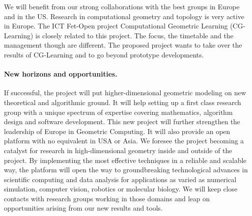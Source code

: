 We will benefit from our strong collaborations with the best groups in Europe and in the US.
Research in computational geometry and topology is very active in  Europe.  The ICT Fet-Open project Computational Geometric Learning (CG-Learning) is closely related to this project. The focus, the timetable and the management though are different. The proposed project wants to take over the results of CG-Learning and to go beyond prototype developments.  





\paragraph{New horizons and opportunities.} 




If successful, the project will put higher-dimensional geometric modeling on new theoretical and algorithmic ground. It will help setting up a first class research group with a unique spectrum of expertise covering mathematics, algorithm design and software development.
This new project will further strengthen the leadership of Europe  in Geometric Computing.
It will also provide an open platform with no equivalent in USA or Asia.
We foresee the project becoming a catalyst for research in high-dimensional geometry inside and outside of the project.  
By implementing the most effective techniques in a  reliable and scalable way, the platform will
open the way to groundbreaking technological advances in scientific computing and data analysis for applications as varied as numerical simulation, computer vision, robotics or molecular biology. We will keep close contacts with research groups working in those domains and leap on opportunities arising from our new results and tools.

{\footnotesize


}


